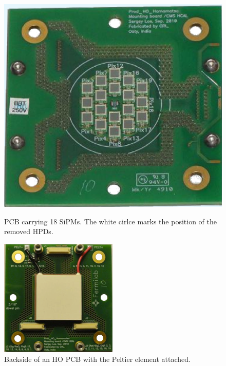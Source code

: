 \begin{figure}[h]
\centering
\begin{minipage}[t]{0.475\textwidth}
\includegraphics[width=\textwidth]{Bilder/pcbSipm.png}
\caption{PCB carrying 18 SiPMs. The white cirlce marks the position of the removed HPDs.}
\label{sipmPcb}
\end{minipage}
\hspace{1cm}
\begin{minipage}[t]{0.435\textwidth}
\includegraphics[width=\textwidth]{Bilder/pcbPeltier.png}
\caption{Backside of an HO PCB with the Peltier element attached.}
\label{peltier}
\end{minipage}
\end{figure}
